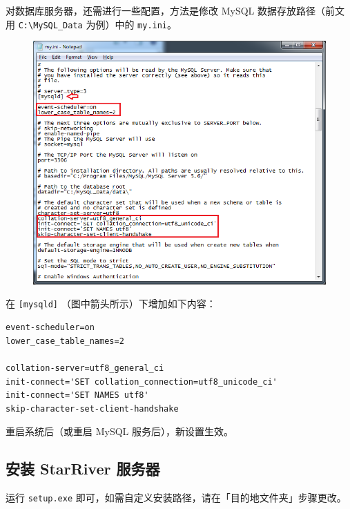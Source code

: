 对数据库服务器，还需进行一些配置，方法是修改 MySQL 数据存放路径（前文用
\texttt{C:\textbackslash{}MySQL\_Data} 为例）中的 \texttt{my.ini}。

\begin{figure}[htbp]
\centering
\includegraphics{../img/my_ini.png}
\end{figure}

在 \texttt{{[}mysqld{]}} （图中箭头所示）下增加如下内容：

\begin{verbatim}
event-scheduler=on
lower_case_table_names=2

collation-server=utf8_general_ci
init-connect='SET collation_connection=utf8_unicode_ci'
init-connect='SET NAMES utf8'
skip-character-set-client-handshake
\end{verbatim}

重启系统后（或重启 MySQL 服务后），新设置生效。

\subsection{安装 StarRiver
服务器}\label{ux5b89ux88c5-starriver-ux670dux52a1ux5668}

运行 \texttt{setup.exe}
即可，如需自定义安装路径，请在「目的地文件夹」步骤更改。

